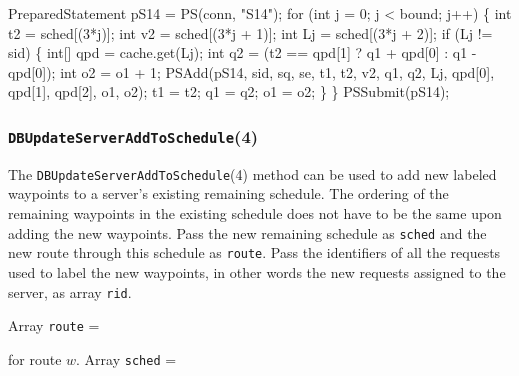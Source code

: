 \documentclass{article}
\def\nwendcode{\endtrivlist \endgroup}      %
\let\nwdocspar=\par
\theoremstyle{definition}                   %
\begin{document}
PreparedStatement pS14 = PS(conn, "S14");
for (int j = 0; j < bound; j++) \{
  int t2 = sched[(3*j)];
  int v2 = sched[(3*j + 1)];
  int Lj = sched[(3*j + 2)];
  if (Lj != sid) \{
    int[] qpd = cache.get(Lj);
    int q2 = (t2 == qpd[1] ? q1 + qpd[0] : q1 - qpd[0]);
    int o2 = o1 + 1;
    PSAdd(pS14, sid, sq, se, t1, t2, v2, q1, q2, Lj,
          qpd[0], qpd[1], qpd[2], o1, o2);
    t1 = t2;
    q1 = q2;
    o1 = o2;
  \}
\}
PSSubmit(pS14);
\nwendcode{}\nwdocspar

\subsubsection{{\tt{}\protect{}DBUpdateServerAddToSchedule}(4)}
The {\tt{}\protect{}DBUpdateServerAddToSchedule}(4) method can be used to add new labeled
waypoints to a server's existing remaining schedule. The ordering of the
remaining waypoints in the existing schedule does not have to be the same
upon adding the new waypoints. Pass the new remaining schedule as {\tt{}sched} and
the new route through this schedule as {\tt{}route}. Pass the identifiers of all
the requests used to label the new waypoints, in other words the new
requests assigned to the server, as array {\tt{}rid}.

Array {\tt{}route} =

\noindent
{}

\noindent for route $w$. Array {\tt{}sched} =

\noindent
{}
\end{document}
